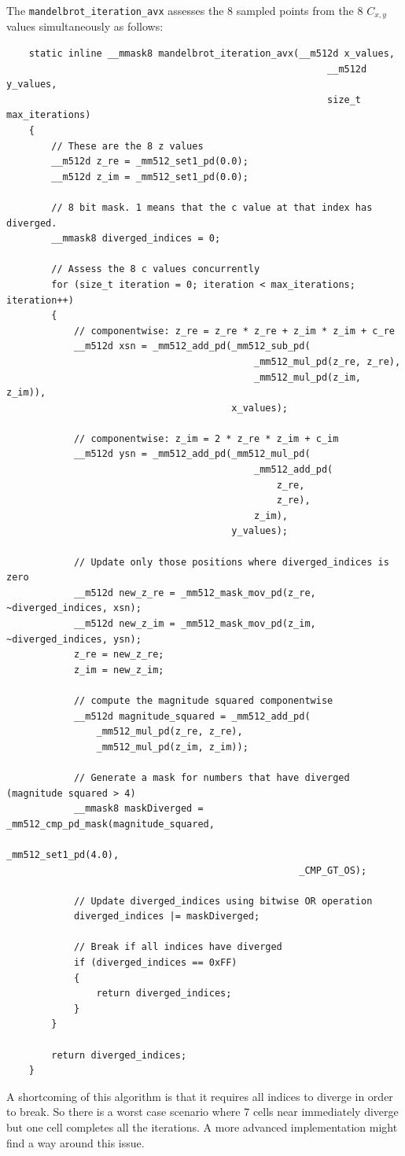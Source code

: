 \documentclass{article}
\begin{document}
\noindent The \texttt{mandelbrot\_iteration\_avx} assesses the 8 sampled points from the 8 $C_{x,y}$ values simultaneously as follows:
\begin{lstlisting}
    static inline __mmask8 mandelbrot_iteration_avx(__m512d x_values,
                                                         __m512d y_values,
                                                         size_t max_iterations)
    {
        // These are the 8 z values
        __m512d z_re = _mm512_set1_pd(0.0);
        __m512d z_im = _mm512_set1_pd(0.0);

        // 8 bit mask. 1 means that the c value at that index has diverged.
        __mmask8 diverged_indices = 0;

        // Assess the 8 c values concurrently
        for (size_t iteration = 0; iteration < max_iterations; iteration++)
        {
            // componentwise: z_re = z_re * z_re + z_im * z_im + c_re
            __m512d xsn = _mm512_add_pd(_mm512_sub_pd(
                                            _mm512_mul_pd(z_re, z_re),
                                            _mm512_mul_pd(z_im, z_im)),
                                        x_values);

            // componentwise: z_im = 2 * z_re * z_im + c_im
            __m512d ysn = _mm512_add_pd(_mm512_mul_pd(
                                            _mm512_add_pd(
                                                z_re,
                                                z_re),
                                            z_im),
                                        y_values);

            // Update only those positions where diverged_indices is zero
            __m512d new_z_re = _mm512_mask_mov_pd(z_re, ~diverged_indices, xsn);
            __m512d new_z_im = _mm512_mask_mov_pd(z_im, ~diverged_indices, ysn);
            z_re = new_z_re;
            z_im = new_z_im;

            // compute the magnitude squared componentwise
            __m512d magnitude_squared = _mm512_add_pd(
                _mm512_mul_pd(z_re, z_re),
                _mm512_mul_pd(z_im, z_im));

            // Generate a mask for numbers that have diverged (magnitude squared > 4)
            __mmask8 maskDiverged = _mm512_cmp_pd_mask(magnitude_squared,
                                                    _mm512_set1_pd(4.0),
                                                    _CMP_GT_OS);

            // Update diverged_indices using bitwise OR operation
            diverged_indices |= maskDiverged;

            // Break if all indices have diverged
            if (diverged_indices == 0xFF)
            {
                return diverged_indices;
            }
        }

        return diverged_indices;
    }
\end{lstlisting}
\noindent A shortcoming of this algorithm is that it requires all indices to diverge 
in order to break. So there is a worst case scenario where 7 cells near immediately 
diverge but one cell completes all the iterations. A more advanced implementation might 
find a way around this issue.
\end{document}
